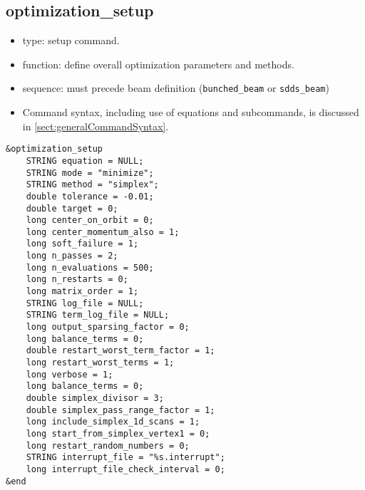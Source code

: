 \documentclass[11pt]{article}
\begin{document}
\subsection{optimization\_setup \label{subsec:optimizationsetup}}

\begin{itemize}
\item type: setup command.
\item function: define overall optimization parameters and methods.
\item sequence: must precede beam definition (\verb|bunched_beam| or \verb|sdds_beam|)
\item Command syntax, including use of equations and subcommands, is discussed in \ref{sect:generalCommandSyntax}.
\end{itemize}

\begin{verbatim}
&optimization_setup
    STRING equation = NULL;
    STRING mode = "minimize";
    STRING method = "simplex";
    double tolerance = -0.01;
    double target = 0;
    long center_on_orbit = 0;
    long center_momentum_also = 1;
    long soft_failure = 1;
    long n_passes = 2;
    long n_evaluations = 500; 
    long n_restarts = 0;
    long matrix_order = 1;
    STRING log_file = NULL;
    STRING term_log_file = NULL;
    long output_sparsing_factor = 0;
    long balance_terms = 0;
    double restart_worst_term_factor = 1;
    long restart_worst_terms = 1;
    long verbose = 1;
    long balance_terms = 0;
    double simplex_divisor = 3;
    double simplex_pass_range_factor = 1;
    long include_simplex_1d_scans = 1;
    long start_from_simplex_vertex1 = 0;
    long restart_random_numbers = 0;
    STRING interrupt_file = "%s.interrupt";
    long interrupt_file_check_interval = 0;
&end
\end{verbatim}
\end{document}
